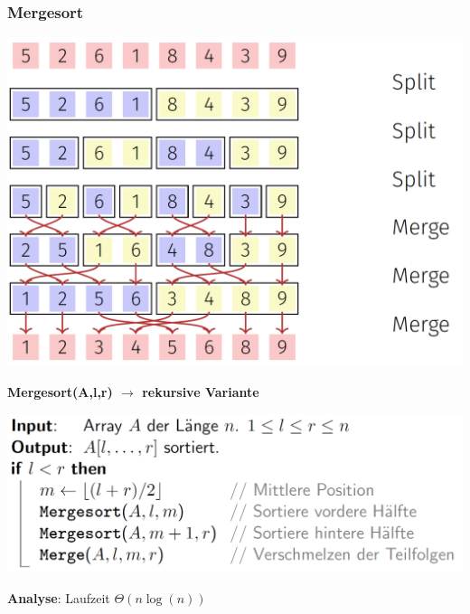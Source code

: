 \begin{sectionbox}
\subsubsection{Mergesort}
\begin{center}
    \includegraphics[width = 0.5\columnwidth]{../img/Mergesort.png}
\end{center}\smallskip
\textbf{Mergesort(A,l,r) $\rightarrow$ rekursive Variante}\par
\includegraphics[width = 0.75\columnwidth]{../img/MergesortCode.png}
\par\smallskip
\textbf{Analyse}: Laufzeit  $\Theta(n \operatorname{log}(n))$
\end{sectionbox}
\vspace{-4pt}
